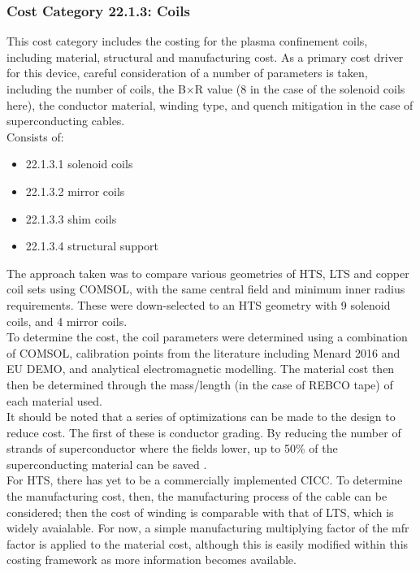\subsubsection*{Cost Category 22.1.3: Coils}

This cost category includes the costing for the plasma confinement coils, including  material, structural and manufacturing cost. As a primary cost driver for this device, careful consideration of a number of parameters is taken, including the number of coils, the B$\times$R value (8 in the case of the solenoid coils here), the conductor material, winding type, and quench mitigation in the case of superconducting cables.\\

Consists of:

\begin{itemize}
    \item 22.1.3.1 solenoid coils
    \item 22.1.3.2 mirror coils
    \item 22.1.3.3 shim coils
    \item 22.1.3.4 structural support
\end{itemize}
   

The approach taken was to compare various geometries of HTS, LTS and copper coil sets using COMSOL, with the same central field and minimum inner radius requirements. These were down-selected to an HTS geometry with 9 solenoid coils, and 4 mirror coils.\\

To determine the cost, the coil parameters were determined using a combination of COMSOL, calibration points from the literature including Menard 2016 \cite{Menard2016} and EU DEMO, and analytical electromagnetic modelling. The material cost then then be determined through the mass/length (in the case of REBCO tape) of each material used.\\

It should be noted that a series of optimizations can be made to the design to reduce cost. The first of these is conductor grading. By reducing the number of strands of superconductor where the fields lower, up to 50\% of the superconducting material can be saved \cite{uglietti2018progressing}.\\

For HTS, there has yet to be a commercially implemented CICC. To determine the manufacturing cost, then, the manufacturing process of the cable can be considered; then the cost of winding is comparable with that of LTS, which is widely avaialable. For now, a simple manufacturing multiplying factor of the mfr factor is applied to the material cost, although this is easily modified within this costing framework as more information becomes available.\\

